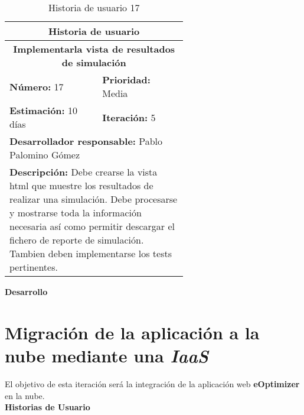 \begin{table}[H]
        \centering
        \begin{tabular}{|p{0.3\linewidth}|p{0.3\linewidth}|}
          \hline
          \multicolumn{2}{|c|}{Historia de usuario}\\ \hline
          \multicolumn{2}{|c|}{\textbf{Implementarla vista de resultados de simulación}}\\ \hline
          \textbf{Número:} 17 & \textbf{Prioridad:} Media\\ \hline
          \textbf{Estimación:} 10 días & \textbf{Iteración:} 5\\ \hline
          \multicolumn{2}{|l|}{\textbf{Desarrollador responsable:} Pablo Palomino Gómez}\\ \hline
          \multicolumn{2}{|p{0.6\linewidth}|}{\textbf{Descripción:} Debe crearse la vista html que muestre los resultados de realizar una simulación. Debe procesarse y mostrarse toda la información necesaria así como permitir descargar el fichero de reporte de simulación. Tambien deben implementarse los tests pertinentes.}\\ \hline
        \end{tabular}
        \caption{Historia de usuario 17}
        \label{tab:hist17}
\end{table}
\textbf{Desarrollo}\\


\section{Migración de la aplicación a la nube mediante una \textit{IaaS}}
\label{sec:hito6}
El objetivo de esta iteración será la integración de la aplicación web \textbf{eOptimizer} en la nube.\\

\textbf{Historias de Usuario}\\

